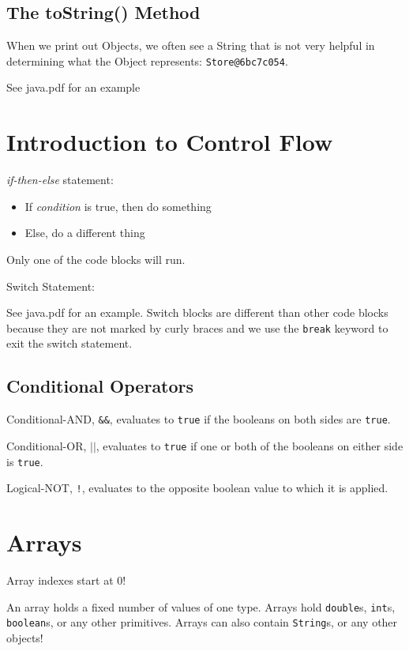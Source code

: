 \documentclass[a4paper, 12pt]{article}
\begin{document}
\subsection{The toString() Method}
When we print out Objects, we often see a String that is not very helpful in determining what the Object represents: \verb|Store@6bc7c054|.

See java.pdf for an example


\section{Introduction to Control Flow}
\textit{if-then-else} statement:
\begin{itemize}
\item If \textit{condition} is true, then do something

\item Else, do a different thing

\end{itemize}

Only one of the code blocks will run.

\vspace{1.3em}

Switch Statement:

See java.pdf for an example. Switch blocks are different than other code blocks because they are not marked by curly braces and we use the \verb|break| keyword to exit the switch statement.

\subsection{Conditional Operators}
Conditional-AND, \verb|&&|, evaluates to \verb|true| if the booleans on both sides are \verb|true|.

Conditional-OR, $\vert\vert$, evaluates to \verb|true| if one or both of the booleans on either side is \verb|true|.

Logical-NOT, \verb|!|, evaluates to the opposite boolean value to which it is applied.


\section{Arrays}
Array indexes start at 0!

An array holds a fixed number of values of one type. Arrays hold \verb|double|s, \verb|int|s, \verb|boolean|s, or any other primitives. Arrays can also contain \verb|String|s, or any other objects!
\end{document}
